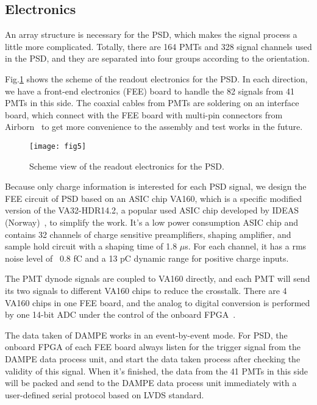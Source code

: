 \documentclass[preprint]{elsarticle}
\begin{document}
\subsection{Electronics}

An array structure is necessary for the PSD, which makes the signal process a little more complicated.
Totally, there are 164 PMTs and 328 signal channels used in the PSD, and they are separated into four groups according to the orientation.

Fig.\ref{fig:fig5} shows the scheme of the readout electronics for the PSD. In each direction, we have a front-end electronics (FEE) board to handle the 82 signals from 41 PMTs in this side. The coaxial cables from PMTs are soldering on an interface board, which connect with the FEE board with multi-pin connectors from Airborn~\cite{airborn} to get more convenience to the assembly and test works in the future.

\begin{figure}
 \centering
 \texttt{[image: fig5]}
\caption{Scheme view of the readout electronics for the PSD.}
\label{fig:fig5}
\end{figure}

Because only charge information is interested for each PSD signal, we design the FEE circuit of PSD based on an ASIC chip VA160, which is a specific modified version of the VA32-HDR14.2, a popular used ASIC chip developed by IDEAS (Norway)~\cite{VA_chip}, to simplify the work. It's a low power consumption ASIC chip and contains 32 channels of charge sensitive preamplifiers, shaping amplifier, and sample hold circuit with a shaping time of 1.8 $\mu$s. For each channel, it has a rms noise level of ~0.8 fC and a 13 pC dynamic range for positive charge inputs.

The PMT dynode signals are coupled to VA160 directly, and each PMT will send its two signals to different VA160 chips to reduce the crosstalk. There are 4 VA160 chips in one FEE board, and the analog to digital conversion is performed by one 14-bit ADC under the control of the onboard FPGA~\cite{fee}.

The data taken of DAMPE works in an event-by-event mode. For PSD, the onboard FPGA of each FEE board always listen for the trigger signal from the DAMPE data process unit, and start the data taken process after checking the validity of this signal. When it's finished, the data from the 41 PMTs in this side will be packed and send to the DAMPE data process unit immediately with a user-defined serial protocol based on LVDS standard.
\end{document}
